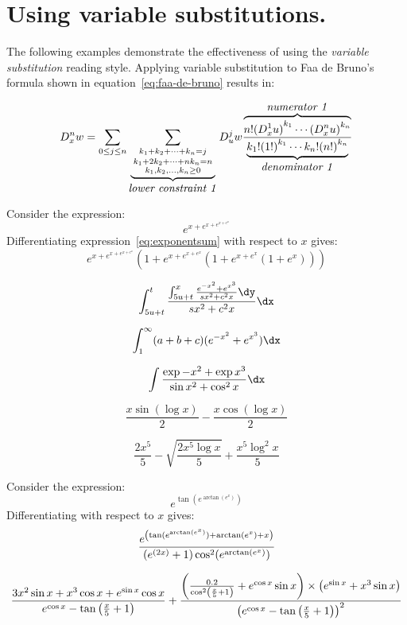 
\section{Using variable substitutions.}
\activatevariablesubstitution

The following examples demonstrate the effectiveness of using the
{\em variable substitution\/}  reading style.
Applying variable substitution to Faa de Bruno's formula shown in
equation~\ref{eq:faa-de-bruno} results in:

\begin{equation}  \label{eq:faa-de-bruno-subst}
  D^n_xw = \sum_{0\le j\le n} \sum_{\underbrace{{\scriptstyle
        k_1+k_2+\cdots+k_n=j \atop {\scriptstyle
          k_1+2k_2+\cdots+nk_n=n \atop {\scriptstyle
            k_1,k_2,\ldots,k_n\ge0 }}}}_{\mbox{\em lower constraint
        1\/}}} D^j_u w
  \frac{\overbrace{n!  {(D^1_x u)}^{k_1} \cdots
      {(D^n_x u)}^{k_n}} ^{\mbox{\em numerator 1\/}}}
  {\underbrace{k_1!{(1!)}^{k_1}
    \cdots k_n!{(n!)}^{k_n}}_{\mbox{\em denominator 1\/}}}
\end{equation}

Consider the expression:
\begin{equation}
  e^{x+e^{x+e^{x+e^x}}} \label{eq:exponentsum}
\end{equation}
Differentiating  expression~\ref{eq:exponentsum} with respect to $x$
gives:
$$   e^{x + e^{x + e^{x + e^x}}} 
      (1 + e^{x + e^{x + e^x}}
      (1 + e^{x + e^x} (1 + e^x)))$$

        $$\int_{5u+t}^t 
        \frac{ \int_{5u+t}^x
          \frac{e^{-x^2} + e^{x^3} }
          {sx^2 + c^{2 }x } \dy}
{s  x^2 + c^2  x}  \dx$$


        $$ \int_1^\infty (a+b+c)(e^{-x^2} + e^{x^3})\dx$$
        
        $$ \int \frac{\exp{-x^2} + \exp {x^3} }{\sin x^2 + \cos^2 x}
        \dx$$
        


$$  \frac{x\sin(\log x)}{2} - \frac{x\cos(\log x)}{2}$$

$$ \frac{2x^5}{5} - \sqrt{\frac{2x^5 \log x}{5}} 
+ \frac{x^5\log^2 x}{5}$$

Consider the expression:
\[ e^{\tan(e^{\arctan(e^x)})}\]
Differentiating with respect to $x$ gives: 
\[
  {e^{\left( \tan(e^{\arctan(e^x)}) + \arctan(e^x) + x \right)} 
       \over (e^{(2 x)} + 1) \cos^2(e^{\arctan(e^x)})}
     \]
     

\[  {3 x^2 \sin{x} + x^3 \cos{x} + e^{\sin{x}} \cos{x} 
       \over e^{\cos{x}} - \tan\left( {x \over 5} + 1 \right)} 
      + {\left( {0.2 \over \cos^2 \left( {x \over 5} + 1 \right)} 
      + e^{\cos{x}} \sin{x} \right) 
           \times \left( e^{\sin{x}} + x^3 \sin{x} \right) 
           \over \left( e^{\cos{x}} 
      - \tan\left( {x \over 5} + 1 \right) \right)^2}
    \]


    \deactivatevariablesubstitution 





